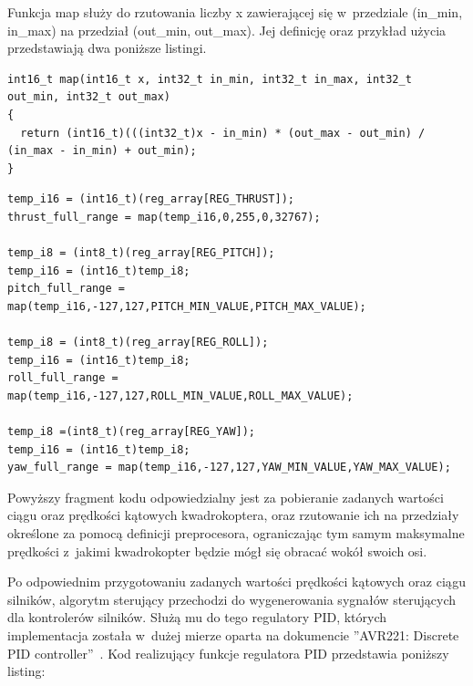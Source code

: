 Funkcja map służy do rzutowania liczby x zawierającej się w~przedziale (in\_min, in\_max) na przedział (out\_min, out\_max). Jej definicję oraz przykład użycia przedstawiają dwa poniższe listingi.

\begin{lstlisting}
int16_t map(int16_t x, int32_t in_min, int32_t in_max, int32_t out_min, int32_t out_max)
{
  return (int16_t)(((int32_t)x - in_min) * (out_max - out_min) / (in_max - in_min) + out_min);
}
\end{lstlisting}



\begin{lstlisting}
temp_i16 = (int16_t)(reg_array[REG_THRUST]);
thrust_full_range = map(temp_i16,0,255,0,32767);

temp_i8 = (int8_t)(reg_array[REG_PITCH]);
temp_i16 = (int16_t)temp_i8;
pitch_full_range = map(temp_i16,-127,127,PITCH_MIN_VALUE,PITCH_MAX_VALUE);

temp_i8 = (int8_t)(reg_array[REG_ROLL]);
temp_i16 = (int16_t)temp_i8;
roll_full_range = map(temp_i16,-127,127,ROLL_MIN_VALUE,ROLL_MAX_VALUE);

temp_i8 =(int8_t)(reg_array[REG_YAW]);
temp_i16 = (int16_t)temp_i8;
yaw_full_range = map(temp_i16,-127,127,YAW_MIN_VALUE,YAW_MAX_VALUE);
\end{lstlisting}

Powyższy fragment kodu odpowiedzialny jest za pobieranie zadanych wartości ciągu oraz prędkości kątowych kwadrokoptera, oraz rzutowanie ich na przedziały określone za pomocą definicji preprocesora, ograniczając tym samym maksymalne prędkości z~jakimi kwadrokopter będzie mógł się obracać wokół swoich osi.

Po odpowiednim przygotowaniu zadanych wartości prędkości kątowych oraz ciągu silników, algorytm sterujący przechodzi do wygenerowania sygnałów sterujących dla kontrolerów silników. Służą mu do tego regulatory PID, których implementacja została w~dużej mierze oparta na dokumencie ''AVR221: Discrete PID controller''~\cite{ds_avrpid}. Kod realizujący funkcje regulatora PID przedstawia poniższy listing:


